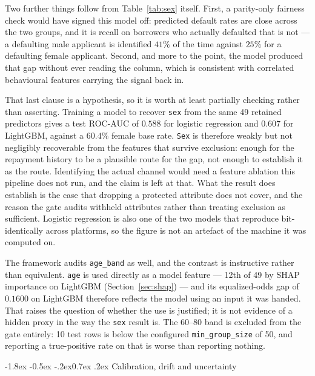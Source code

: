 \documentclass[10pt,a4paper]{article}
\makeatletter
\renewcommand\subsection{\@startsection{subsection}{2}{\z@}%
  {-1.8ex \@plus -0.5ex \@minus -.2ex}{0.7ex \@plus .2ex}%
  {\normalfont\normalsize\bfseries}}
\newcommand{\code}[1]{\texttt{\small #1}}
\makeatother
\begin{document}
Two further things follow from Table~\ref{tab:sex} itself. First, a parity-only
fairness check would have signed this model off: predicted default rates are close
across the two groups, and it is recall on borrowers who actually defaulted that
is not --- a defaulting male applicant is identified $41\%$ of the time against
$25\%$ for a defaulting female applicant. Second, and more to the point, the model
produced that gap without ever reading the column, which is consistent with
correlated behavioural features carrying the signal back in.

That last clause is a hypothesis, so it is worth at least partially checking
rather than asserting. Training a model to recover \code{sex} from the same 49
retained predictors gives a test ROC-AUC of $0.588$ for logistic regression and
$0.607$ for LightGBM, against a $60.4\%$ female base rate. \code{Sex} is therefore
weakly but not negligibly recoverable from the features that survive exclusion:
enough for the repayment history to be a plausible route for the gap, not enough
to establish it as the route. Identifying the actual channel would need a feature
ablation this pipeline does not run, and the claim is left at that. What the
result does establish is the case that dropping a protected attribute does not
cover, and the reason the gate audits withheld attributes rather than treating
exclusion as sufficient. Logistic regression is also one of the two models that
reproduce bit-identically across platforms, so the figure is not an artefact of
the machine it was computed on.

The framework audits \code{age\_band} as well, and the contrast is instructive
rather than equivalent. \code{age} is used directly as a model feature --- 12th
of 49 by SHAP importance on LightGBM (Section~\ref{sec:shap}) --- and its
equalized-odds gap of $0.1600$ on LightGBM therefore reflects the model using an
input it was handed. That raises the question of whether the use is justified;
it is not evidence of a hidden proxy in the way the \code{sex} result is. The
60--80 band is excluded from the gate entirely: 10 test rows is below the
configured \code{min\_group\_size} of 50, and reporting a true-positive rate on
that is worse than reporting nothing.

\subsection{Calibration, drift and uncertainty}
\end{document}
